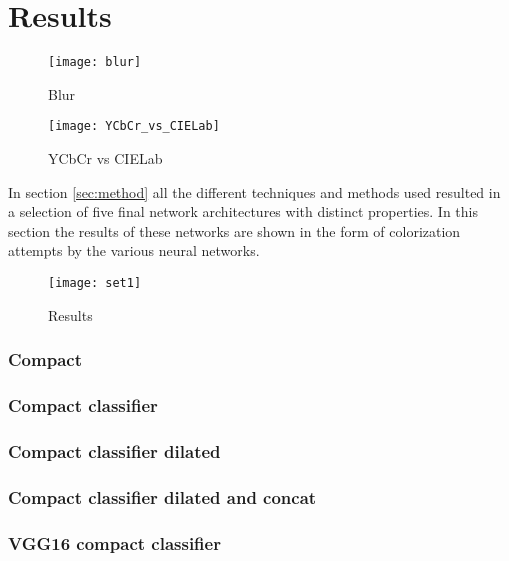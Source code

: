 \section{Results}\label{sec:results}
\begin{figure}[h]
	\centering
	\texttt{[image: blur]}
	\caption{Blur}
	\label{fig:blur}
\end{figure}

\begin{figure}[h]
	\centering
	\texttt{[image: YCbCr\_vs\_CIELab]}
	\caption{YCbCr vs CIELab}
	\label{fig:YCbCr_vs_CIELab}
\end{figure}

In section \ref{sec:method} all the different techniques and methods used resulted in a selection of five final network architectures with distinct properties. In this section the results of these networks are shown in the form of colorization attempts by the various neural networks. 

\begin{figure}[h]
	\centering
	\texttt{[image: set1]}
	\caption{Results}
	\label{fig:results}
\end{figure}


\subsubsection{Compact}



\subsubsection{Compact classifier}


\subsubsection{Compact classifier dilated}


\subsubsection{Compact classifier dilated and concat}


\subsubsection{VGG16 compact classifier}



